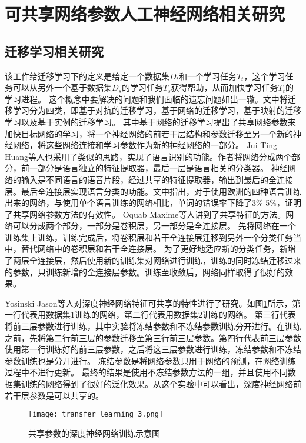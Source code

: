 \section{可共享网络参数人工神经网络相关研究}

\subsection{迁移学习相关研究}
该工作\cite{10.1007/978-3-030-01424-7_27}给迁移学习下的定义是给定一个数据集$D_t$和一个学习任务$T_t$，这个学习任务可以从另外一个基于数据集$D_s$的学习任务$T_s$获得帮助，从而加快学习任务$T_t$的学习进程。
这个概念中要解决的问题和我们面临的遗忘问题如出一辙。文中将迁移学习分为四类，即基于对抗的迁移学习，基于网络的迁移学习，基于映射的迁移学习以及基于实例的迁移学习。
其中基于网络的迁移学习提出了共享网络参数来加快目标网络的学习，将一个神经网络的前若干层结构和参数迁移至另一个新的神经网络，将这些网络连接和学习参数作为新的神经网络的一部分。
Jui-Ting Huang等人\cite{6639081}也采用了类似的思路，实现了语言识别的功能。作者将网络分成两个部分，前一部分是语言独立的特征提取器，最后一层是语言相关的分类器。
神经网络的输入是不同语言的语音片段，经过共享的特征提取器，输出到最后的全连接层。最后全连接层实现语言分类的功能。文中指出，对于使用欧洲的四种语言训练出来的网络，与使用单个语言训练的网络相比，单词的错误率下降了3\%-5\%，证明了共享网络参数方法的有效性。
Oquab Maxime等人\cite{Oquab_2014_CVPR}讲到了共享特征的方法。网络可以分成两个部分，一部分是卷积层，另一部分是全连接层。
先将网络在一个训练集上训练，训练完成后，将卷积层和若干全连接层迁移到另外一个分类任务当中，替代网络中的卷积层和若干全连接层。
为了更好地适应新的分类任务，新增了两层全连接层，然后使用新的训练集对网络进行训练，训练的同时冻结迁移过来的参数，只训练新增的全连接层参数。训练至收敛后，网络同样取得了很好的效果。 

Yosinski Jason等人\cite{yosinski_2014_NIPS}对深度神经网络特征可共享的特性进行了研究。如图\ref{fig:transfer_learning_3}所示，第一行代表用数据集1训练的网络，第二行代表用数据集2训练的网络。
第三行代表将前三层参数进行训练，其中实验将冻结参数和不冻结参数训练分开进行。在训练之前，先将第二行前三层的参数迁移至第三行前三层参数。第四行代表前三层参数使用第一行训练好的前三层参数，之后将这三层参数进行训练，冻结参数和不冻结参数训练也是分开进行。
冻结参数是将网络参数只用于网络的预测，在网络训练过程中不进行更新。
最终的结果是使用不冻结参数方法的一组，并且使用不同数据集训练的网络得到了很好的泛化效果。从这个实验中可以看出，深度神经网络前若干层参数是可以共享的。
\begin{figure}
    \centering
    \texttt{[image: transfer\_learning\_3.png]}
    \caption{共享参数的深度神经网络训练示意图}
    \label{fig:transfer_learning_3}
\end{figure}

